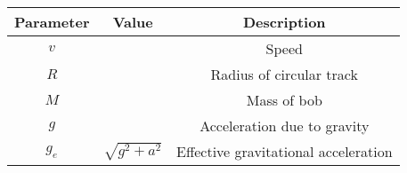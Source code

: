 \begin{tabular}{ | c | c | c | }
    \hline
    Parameter & Value & Description \\
    \hline
    $v$ && Speed \\
    \hline
    $R$ && Radius of circular track \\
    \hline
    $M$ && Mass of bob \\
    \hline
    $g$ && Acceleration due to gravity \\
    \hline
    $g_e$ & $\sqrt{g^2 + a^2}$ & Effective gravitational acceleration \\
    \hline
\end{tabular}